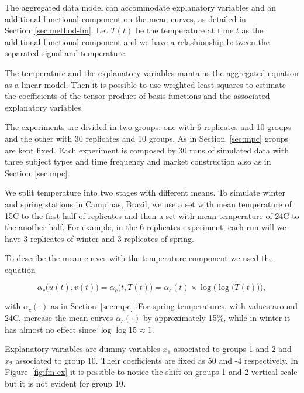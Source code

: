 The aggregated data model can accommodate explanatory variables and an additional functional component on the mean curves, as detailed in Section~\ref{sec:method-fm}. Let $T(t)$ be the temperature at time $t$ as the additional functional component and we have a relashionship between the separated signal and temperature.

The temperature and the explanatory variables mantains the aggregated equation as a linear model. Then it is possible to use weighted least squares to  estimate the coefficients of the tensor product of basis  functions and the  associated explanatory variables.

The experiments are divided in two groups:  one with 6 replicates and 10 groups and the other with 30 replicates and 10 groups. As in Section~\ref{sec:mpc} groups are kept fixed. Each experiment is composed by 30 runs of simulated data with three subject types and time frequency and market construction also as in Section~\ref{sec:mpc}.

We split temperature into two stages with different means. To simulate winter and spring stations in Campinas, Brazil, we use a set with mean temperature of 15\textdegree C to the first half of replicates and then a set with mean temperature of 24\textdegree C to the another half. For example, in the 6 replicates experiment, each run will we have 3 replicates of winter and 3 replicates of spring. 

To describe the mean curves with the temperature component we used the equation

\begin{equation}
  \label{eq:simu-mc}
  \alpha_c\Big(u(t), v(t)\Big)
  =
  \alpha_c\Big(t, T(t)\Big)
  =
  \alpha_c(t)
  \times
  \log
  \Big(
  \log
  \big(
  T(t)
  \big)
  \Big),  
\end{equation}

\noindent with $\alpha_c(\cdot)$ as in Section~\ref{sec:mpc}. 
For spring temperatures, with values around 24\textdegree C,  increase the mean curves $\alpha_c(\cdot)$ by approximately 15\%, while in winter it has almost no effect since $\log \log 15 \approx 1$.

Explanatory variables are dummy variables $x_1$ associated to groups 1 and 2 and $x_2$ associated to group 10. Their coefficients are fixed as 50 and -4 respectively. In Figure~\ref{fig:fm-ex} it is possible to notice the shift on groups 1 and 2 vertical scale but it is not evident for group 10.

